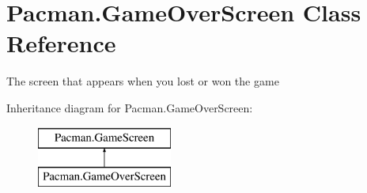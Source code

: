 \hypertarget{class_pacman_1_1_game_over_screen}{\section{Pacman.\-Game\-Over\-Screen Class Reference}
\label{class_pacman_1_1_game_over_screen}
}


The screen that appears when you lost or won the game  


Inheritance diagram for Pacman.\-Game\-Over\-Screen\-:\begin{figure}[H]
\begin{center}
\leavevmode
\includegraphics[height=2.000000cm]{class_pacman_1_1_game_over_screen}
\end{center}
\end{figure}
